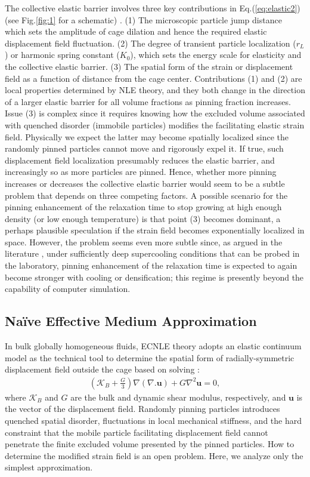 \documentclass[twocolumn,showpacs,preprintnumbers,amsmath,amssymb,unsortedaddress,
]{revtex4-1}
\begin{document}
The collective elastic barrier involves three key contributions in Eq.(\ref{eq:elastic2}) (see Fig.\ref{fig:1} for a schematic) \cite{7}. (1) The microscopic particle jump distance which sets the amplitude of cage dilation and hence the required elastic displacement field fluctuation. (2) The degree of transient particle localization ($r_L$) or harmonic spring constant ($K_0$), which sets the energy scale for elasticity and the collective elastic barrier. (3) The spatial form of the strain or displacement field as a function of distance from the cage center. Contributions (1) and (2) are local properties determined by NLE theory, and they both change in the direction of a larger elastic barrier for all volume fractions as pinning fraction increases. Issue (3) is complex since it requires knowing how the excluded volume associated with quenched disorder (immobile particles) modifies the facilitating elastic strain field. Physically we expect the latter may become spatially localized since the randomly pinned particles cannot move and rigorously expel it. If true, such displacement field localization presumably reduces the elastic barrier, and increasingly so as more particles are pinned. Hence, whether more pinning increases or decreases the collective elastic barrier would seem to be a subtle problem that depends on three competing factors. A possible scenario for the pinning enhancement of the relaxation time to stop growing at high enough density (or low enough temperature) is that point (3) becomes dominant, a perhaps plausible speculation if the strain field becomes exponentially localized in space.  However, the problem seems even more subtle since, as argued in the literature \cite{25}, under sufficiently deep supercooling conditions that can be probed in the laboratory, pinning enhancement of the relaxation time is expected to again become stronger with cooling or densification; this regime is presently beyond the capability of computer simulation. 
\subsection{{Na\"ive} Effective Medium Approximation}
In bulk globally homogeneous fluids, ECNLE theory adopts an elastic continuum model as the technical tool to determine the spatial form of radially-symmetric displacement field outside the cage based on solving \cite{11}: 
\begin{eqnarray}
\left(\mathcal{K}_B+\frac{G}{3}\right)\nabla(\nabla .\mathbf{u}) + G\nabla^2\mathbf{u}  = 0,
\label{eq:40}
\end{eqnarray}
where $\mathcal{K}_B$ and $G$ are the bulk and dynamic shear modulus, respectively, and $\mathbf{u}$ is the vector of the displacement field. Randomly pinning particles introduces quenched spatial disorder, fluctuations in local mechanical stiffness, and the hard constraint that the mobile particle facilitating displacement field cannot penetrate the finite excluded volume presented by the pinned particles. How to determine the modified strain field is an open problem. Here, we analyze only the simplest approximation.
\end{document}
